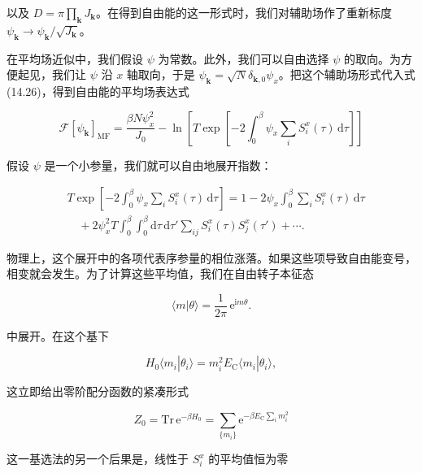 以及 $D=\pi\prod_{\mathbf{k}}J_{\mathbf{k}}$。在得到自由能的这一形式时，我们对辅助场作了重新标度 $\psi_{\mathbf{k}}\rightarrow\psi_{\mathbf{k}}/\sqrt{J_{\mathbf{k}}}$。

在平均场近似中，我们假设 $\psi$ 为常数。此外，我们可以自由选择 $\psi$ 的取向。为方便起见，我们让 $\psi$ 沿 $x$ 轴取向，于是 $\psi_{\mathbf{k}}=\sqrt{N}\delta_{\mathbf{k},0}\psi_x$。把这个辅助场形式代入式 (14.26)，得到自由能的平均场表达式

\begin{equation*}
\mathcal{F}[\psi_{\mathbf{k}}]_{\mathrm{MF}} = \frac{\beta N \psi_x^2}{J_0} - \ln\left[ \left. T \exp\left[ -2\int_0^{\beta} \psi_x \sum_i S_i^x(\tau)\,\mathrm{d}\tau \right] \right. \right]\tag{14.27}
\end{equation*}

假设 $\psi$ 是一个小参量，我们就可以自由地展开指数：

\begin{align*}
& \left. T \exp\left[ -2\int_0^{\beta} \psi_x \sum_i S_i^x(\tau)\,\mathrm{d}\tau \right] \right. = 1 - 2\psi_x \left. \int_0^{\beta} \sum_i S_i^x(\tau)\,\mathrm{d}\tau \right. \\
& \quad + 2\psi_x^2 \left. T \int_0^{\beta}\int_0^{\beta} \mathrm{d}\tau\,\mathrm{d}\tau' \sum_{ij} S_i^x(\tau) S_j^x(\tau') \right. + \cdots.\tag{14.28}
\end{align*}

物理上，这个展开中的各项代表序参量的相位涨落。如果这些项导致自由能变号，相变就会发生。为了计算这些平均值，我们在自由转子本征态

\begin{equation*}
\langle m|\theta\rangle = \frac{1}{2\pi}\,\mathrm{e}^{\mathrm{i}m\theta}.\tag{14.29}
\end{equation*}

中展开。在这个基下

\begin{equation*}
H_0\langle m_i|\theta_i\rangle = m_i^2 E_{\mathrm{C}} \langle m_i|\theta_i\rangle,\tag{14.30}
\end{equation*}

这立即给出零阶配分函数的紧凑形式

\begin{equation*}
Z_0 = \mathrm{Tr}\,\mathrm{e}^{-\beta H_0} = \sum_{\{m_i\}} \mathrm{e}^{-\beta E_{\mathrm{C}} \sum_i m_i^2}\tag{14.31}
\end{equation*}

这一基选法的另一个后果是，线性于 $S_i^x$ 的平均值恒为零

